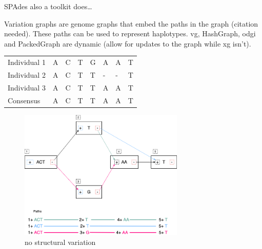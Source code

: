 \documentclass[11pt]{article}
\begin{document}
SPAdes also a toolkit does…

\newpage
Variation graphs are genome graphs that embed the paths in the graph 
(citation needed).
These paths can be used to represent haplotypes. vg, HashGraph, odgi and
PackedGraph are dynamic (allow for updates to the graph while xg isn’t).


\begin{center}
\begin{tabular}{llllllll}
\color{mypink}Individual 1 & \color{mypink} A & \color{mypink} C & \color{mypink} T & \color{mypink} G & \color{mypink} A & \color{mypink} A & \color{mypink} T\\
\color{myblue}Individual 2 & \color{myblue} A & \color{myblue} C & \color{myblue} T & \color{myblue} T & \color{myblue} - & \color{myblue} - & \color{myblue} T\\
\color{mygreen}Individual 3 & \color{mygreen} A & \color{mygreen} C & \color{mygreen} T & \color{mygreen} T & \color{mygreen} A & \color{mygreen} A & \color{mygreen} T\\
\hline
\color{red}Consensus & \color{red} A & \color{red} C & \color{red} T & \color{red} T & \color{red} A & \color{myred} A & \color{red} T\\
\end{tabular}
\end{center}

\begin{figure}[H]
\centering
\includegraphics[width=0.7\textwidth]{figures/Variation Graph-Page-1.png}
\caption{no structural variation}\label{no struct}
\end{figure}
\end{document}
